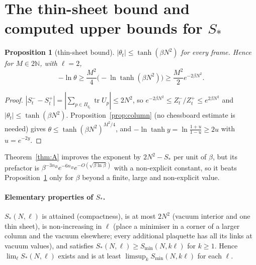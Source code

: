 \documentclass[11pt,a4paper]{article}
\newtheorem{proposition}[lemma]{Proposition}
\theoremstyle{definition}
\theoremstyle{remark}
\newcommand{\tr}{\operatorname{tr}}
\begin{document}
\section{The thin-sheet bound and computed upper bounds for $S_*$}\label{sec:numbers}

\begin{proposition}[thin-sheet bound]\label{prop:trivial}
$|\theta_t|\le\tanh(\beta N^2)$ for every frame. Hence for $M\in2\mathbb{N}$, with $\ell=2$,
\[ -\ln\theta\ge\frac{M^2}{4}\big(-\ln\tanh(\beta N^2)\big)\ge\frac{M^2}{2}e^{-2\beta N^2}. \]
\end{proposition}
\begin{proof}
$|S^-_t-S^+_t|=|\sum_{p\in\Pi_{q_t}}\tr U_p|\le2N^2$, so $e^{-2\beta N^2}\le Z^-_t/Z^+_t\le e^{2\beta N^2}$ and $|\theta_t|\le\tanh(\beta N^2)$. Proposition~\ref{prop:column} (no chessboard estimate is needed) gives $\theta\le\tanh(\beta N^2)^{M^2/4}$, and $-\ln\tanh y=\ln\frac{1+u}{1-u}\ge2u$ with $u=e^{-2y}$.
\end{proof}

Theorem~\ref{thm:A} improves the exponent by $2N^2-S_*$ per unit of $\beta$, but its prefactor is $\beta^{-3n_B}e^{-6n_B}e^{-O(\sqrt{\beta\ln\beta})}$ with a non-explicit constant, so it beats Proposition~\ref{prop:trivial} only for $\beta$ beyond a finite, large and non-explicit value.

\paragraph{Elementary properties of $S_*$.}
$S_*(N,\ell)$ is attained (compactness), is at most $2N^2$ (vacuum interior and one thin sheet), is non-increasing in $\ell$ (place a minimiser in a corner of a larger column and the vacuum elsewhere; every additional plaquette has all its links at vacuum values), and satisfies $S_*(N,\ell)\ge S_{\min}(N,k\ell)$ for $k\ge1$. Hence $\lim_\ell S_*(N,\ell)$ exists and is at least $\limsup_kS_{\min}(N,k\ell)$ for each $\ell$.
\end{document}
